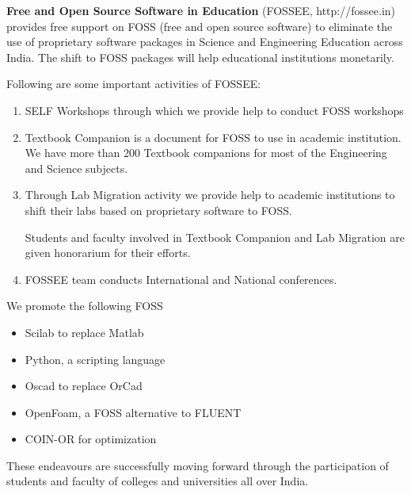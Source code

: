 \documentclass{letter}
\begin{document}
 \vspace{-26 cm}

\textbf{Free and Open Source Software in Education} (FOSSEE, http://fossee.in)
provides free support on FOSS (free and open source software) to eliminate the
use of proprietary software packages in Science and Engineering Education
across India. The shift to FOSS packages will help educational institutions
monetarily.

\noindent Following are some important activities of FOSSEE: 

\begin {enumerate}

\item SELF Workshops through which we provide help to conduct FOSS workshops

\item Textbook Companion is a document for FOSS to use in academic institution.
We have more than 200 Textbook companions for most of the Engineering and
Science subjects.

\item Through Lab Migration activity we provide help to academic institutions
to shift their labs based on proprietary software to FOSS. 

\newline Students and faculty involved in Textbook Companion and Lab
Migration are given honorarium for their efforts.

\item FOSSEE team conducts International and National conferences.

\end {enumerate}

We promote the following FOSS 

\begin{itemize}

\item Scilab to replace Matlab
 
\item Python, a scripting language

\item Oscad to replace OrCad

\item OpenFoam, a FOSS alternative to FLUENT

\item COIN-OR for optimization

\end{itemize}

These endeavours are successfully moving forward through the participation of
students and faculty of colleges and universities all over India.
\end{document}
